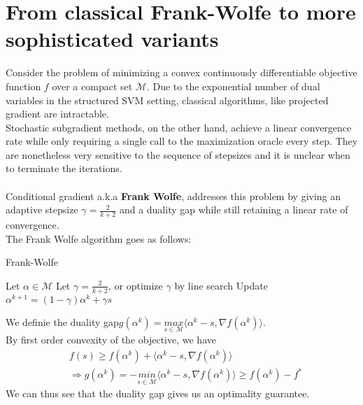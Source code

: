 \documentclass{article}
\begin{document}
\section{From classical Frank-Wolfe to more sophisticated variants}
Consider the problem of minimizing a convex continuously differentiable objective function $f$ over a compact set $\mathcal{M}$. Due to the exponential number of dual variables in the structured SVM setting, classical algorithms, like projected gradient are intractable.
\\
Stochastic subgradient methods, on the other hand, achieve a linear convergence rate while only requiring a single call to the maximization oracle every step. They are nonetheless very sensitive to the sequence of stepsizes and it is unclear when to terminate the iterations.
\\
\\
Conditional gradient a.k.a \textbf{Frank Wolfe}, addresses this problem by giving an  adaptive stepsize $\gamma= \frac{2}{k+2}$ and a duality gap while still retaining a linear rate of convergence.
\\
The Frank Wolfe algorithm goes as follows:
\begin{algorithm}[tb]
   \caption{Frank-Wolfe}
   \label{alg:example}
\begin{algorithmic}
   \STATE Let $\alpha\in\mathcal{M}$
   \STATE Let $\gamma = \frac{2}{k+2}$, or optimize $\gamma$ by line search
   \STATE Update $\alpha^{k+1}= (1-\gamma)\alpha^{k}+ \gamma s$
   \ENDFOR
\end{algorithmic}
\end{algorithm}
We definie the duality gap\quad $g(\alpha^{k})= \underset{s\in\mathcal{M}}{\textit{max}}\langle \alpha^{k}-s, \nabla f(\alpha^{k})\rangle$.\\
By first order convexity of the objective, we have
\begin{equation*}
\begin{aligned}
    &f(s)\geq f(\alpha^{k})+ \langle \alpha^{k}-s, \nabla f(\alpha^{k})\rangle\\
    &\Longrightarrow g(\alpha^{k})= -\underset{s\in\mathcal{M}}{\textit{min}}\langle \alpha^{k}-s, \nabla f(\alpha^{k})\rangle \geq f(\alpha^{k})- f^{*}
\end{aligned}
\end{equation*}
We can thus see that the duality gap gives us an optimality guarantee. 
\\
\end{document}
